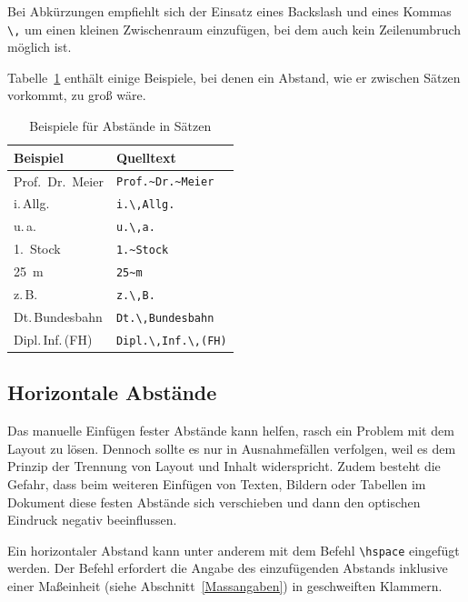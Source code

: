 \documentclass[a4paper,10pt,twoside]{scrbook}
\begin{document}
Bei Abkürzungen empfiehlt sich 
der Einsatz eines Backslash und eines Kommas \verb!\,! um 
einen kleinen Zwischenraum einzufügen, bei dem auch kein Zeilenumbruch möglich ist.

Tabelle~\ref{Tabelle_Beispiele_Abstaende_Saetze} enthält einige Beispiele, bei denen ein Abstand, wie er zwischen Sätzen vorkommt, zu groß wäre.

\begin{table}[h!tb]
\centering
\caption{Beispiele für Abstände in Sätzen}
\label{Tabelle_Beispiele_Abstaende_Saetze}       %
\begin{tabular}{ll}
\hline
Beispiel & Quelltext \\
\hline
Prof.~Dr.~Meier & \texttt{Prof.\textasciitilde Dr.\textasciitilde Meier} \\
i.\,Allg. & \texttt{i.\textbackslash ,Allg.} \\
u.\,a. & \texttt{u.\textbackslash ,a.} \\
1.~Stock & \texttt{1.\textasciitilde Stock} \\
25~m & \texttt{25\textasciitilde m}\\ 
z.\,B. & \texttt{z.\textbackslash ,B.}\\
Dt.\,Bundesbahn & \texttt{Dt.\textbackslash ,Bundesbahn} \\
Dipl.\,Inf.\,(FH) & \texttt{Dipl.\textbackslash ,Inf.\textbackslash ,(FH)}\\
\hline
\end{tabular}
\end{table}









\subsection{Horizontale Abstände}
\label{Abschnitt:hspace}


Das manuelle Einfügen fester Abstände kann helfen, rasch ein Problem mit dem Layout zu lösen. Dennoch sollte es nur in Ausnahmefällen verfolgen, weil es dem Prinzip der Trennung von Layout und Inhalt widerspricht. Zudem besteht die Gefahr, dass beim weiteren Einfügen von Texten, Bildern oder Tabellen im Dokument diese festen Abstände sich verschieben und dann den optischen Eindruck negativ beeinflussen.

Ein horizontaler Abstand kann unter anderem mit dem Befehl
\verb!\hspace! 
eingefügt werden. Der Befehl erfordert die Angabe des 
einzufügenden Abstands inklusive einer Maßeinheit 
(siehe Abschnitt~\ref{Massangaben}) in geschweiften Klammern.
\end{document}
